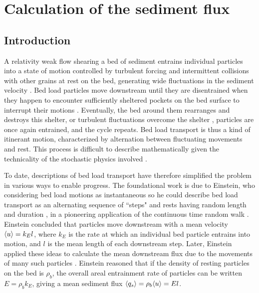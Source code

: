 
\chapter{Calculation of the sediment flux}
\label{ch:flux}
\section{Introduction}

A relativity weak flow shearing a bed of sediment entrains individual particles into a state of motion controlled by turbulent forcing and intermittent collisions with other grains at rest on the bed, generating wide fluctuations in the sediment velocity \citep{Heyman2016,Fathel2015}.
Bed load particles move downstream until they are disentrained when they happen to encounter sufficiently sheltered pockets on the bed surface to interrupt their motions \citep{Charru2004,Gordon1972}.
Eventually, the bed around them rearranges and destroys this shelter, or turbulent fluctuations overcome the shelter \citep{Celik2019,Valyrakis2014}, particles are once again entrained, and the cycle repeats.
Bed load transport is thus a kind of itinerant motion, characterized by alternation between fluctuating movements and rest.
This process is difficult to describe mathematically given the technicality of the stochastic physics involved \citep{Furbish2017,Ancey2020}.

To date, descriptions of bed load transport have therefore simplified the problem in various ways to enable progress.
The foundational work is due to Einstein, who considering bed load motions as instantaneous so he could describe bed load transport as an alternating sequence of ``steps" and rests having random length and duration \citep{Einstein1937}, in a pioneering application of the continuous time random walk \citep{Montroll1965}.
Einstein concluded that particles move downstream with a mean velocity $\langle u \rangle = k_E l$, where $k_E$ is the rate at which an individual bed particle entrains into motion, and $l$ is the mean length of each downstream step.
Later, Einstein applied these ideas to calculate the mean downstream flux due to the movements of many such particles \citep{Einstein1950}. Einstein reasoned that if the density of resting particles on the bed is $\rho_b$, the overall areal entrainment rate of particles can be written $E = \rho_b k_E$, giving a mean sediment flux $\langle q_s \rangle = \rho_b \langle u \rangle  = El $.

